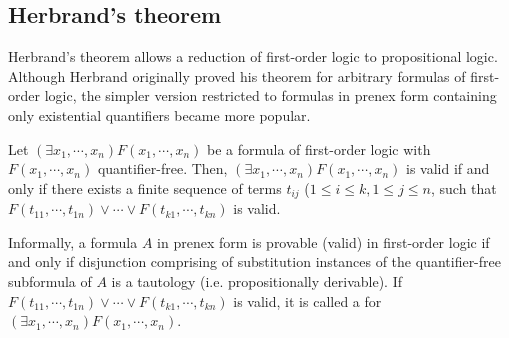 \subsection{Herbrand's theorem}
Herbrand's theorem allows a reduction of first-order logic to propositional
logic. Although Herbrand originally proved his theorem for arbitrary
formulas of first-order logic, the simpler version restricted to formulas in
prenex form containing only existential quantifiers became more popular.
\begin{theorem}
Let $(\exists x_1, \cdots, x_n) F(x_1, \cdots, x_n)$ be a formula of
first-order logic with $F(x_1, \cdots, x_n)$ quantifier-free.
Then, $(\exists x_1, \cdots, x_n) F(x_1, \cdots, x_n)$ is valid if and only if
there exists a finite sequence of terms $t_{ij}$ ($1 \le i \le k, 1 \le j \le
n$, such that $F(t_{11}, \cdots, t_{1n}) \vee \cdots \vee F(t_{k1}, \cdots,
t_{kn})$ is valid.
\end{theorem}
Informally, a formula $A$ in prenex form is provable (valid) in first-order
logic if and only if disjunction comprising of substitution instances of the
quantifier-free subformula of $A$ is a tautology (i.e. propositionally
derivable). If $F(t_{11}, \cdots, t_{1n}) \vee \cdots \vee F(t_{k1}, \cdots,
t_{kn})$ is valid, it is called a  for 
$(\exists x_1, \cdots, x_n) F(x_1, \cdots, x_n)$.

